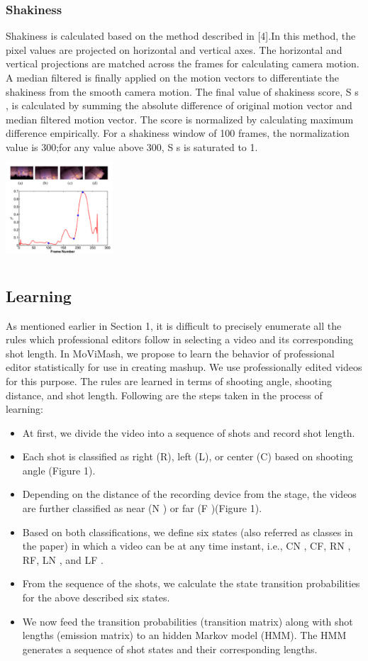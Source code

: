\documentclass{sig-alternate}
\begin{document}
\subsubsection{Shakiness}
Shakiness is calculated based on the method described in [4].In this method, the pixel values are projected on horizontal and vertical axes. The horizontal and vertical projections are matched across the frames for calculating camera motion. A median filtered is finally applied on the motion vectors to differentiate the shakiness from the smooth camera motion. The final value of shakiness score, S s , is calculated by summing the absolute difference of original motion vector and median filtered motion vector. The score is normalized by calculating maximum difference empirically. For a shakiness window of 100 frames, the normalization value is 300;for any value above 300, S s is saturated to 1.
\includegraphics[width=4cm, height=4cm]{img4.png}
\subsection{Learning}
As mentioned earlier in Section 1, it is difficult to precisely enumerate all the rules which professional editors follow in selecting a video and its corresponding shot length. In MoViMash, we propose to learn the behavior of professional editor statistically for use in creating mashup. We use professionally edited videos for this purpose. The rules are learned in terms of shooting angle, shooting distance, and shot length. Following are the steps taken in the process of learning:
\begin{itemize}
    \item At first, we divide the video into a sequence of shots and record shot length.
    \item Each shot is classified as right (R), left (L), or center (C) based on shooting angle (Figure 1).
    \item Depending on the distance of the recording device from the stage, the videos are further classified as near (N ) or far (F )(Figure 1).
    \item Based on both classifications, we define six states (also referred as classes in the paper) in which a video can be at any time instant, i.e., CN , CF, RN , RF, LN , and LF .
    \item From the sequence of the shots, we calculate the state transition probabilities for the above described six states.
    \item We now feed the transition probabilities (transition matrix) along with shot lengths (emission matrix) to an hidden Markov model (HMM). The HMM generates a sequence of shot states and their corresponding lengths.
\end{itemize}
\end{document}

